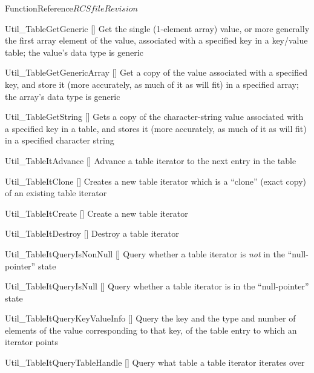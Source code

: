 \begin{cactuspart}{FunctionReference}{$RCSfile$}{$Revision$}
\begin{Lentry}
\item[Util\_TableGetGeneric]
     [\pageref{Util-TableGetGeneric}]
Get the single (1-element array) value, or more generally the
first array element of the value, associated with a specified key
in a key/value table; the value's data type is generic

\item[Util\_TableGetGenericArray]
     [\pageref{Util-TableGetGenericArray}]
Get a copy of the value associated with a specified key, and store
it (more accurately, as much of it as will fit) in a specified array;
the array's data type is generic

\item[Util\_TableGetString]
     [\pageref{Util-TableGetString}]
Gets a copy of the character-string value associated with a specified
key in a table, and stores it (more accurately, as much of it as will fit)
in a specified character string

\item[Util\_TableItAdvance]
     [\pageref{Util-TableItAdvance}]
Advance a table iterator to the next entry in the table

\item[Util\_TableItClone]
     [\pageref{Util-TableItClone}]
Creates a new table iterator which is a ``clone'' (exact copy) of an
existing table iterator

\item[Util\_TableItCreate]
     [\pageref{Util-TableItCreate}]
Create a new table iterator

\item[Util\_TableItDestroy]
     [\pageref{Util-TableItDestroy}]
Destroy a table iterator

\item[Util\_TableItQueryIsNonNull]
     [\pageref{Util-TableItQueryIsNonNull}]
Query whether a table iterator is {\em not\/} in the ``null-pointer'' state

\item[Util\_TableItQueryIsNull]
     [\pageref{Util-TableItQueryIsNull}]
Query whether a table iterator is in the ``null-pointer'' state

\item[Util\_TableItQueryKeyValueInfo]
     [\pageref{Util-TableItQueryKeyValueInfo}]
Query the key and the type and number of elements of the value
corresponding to that key, of the table entry to which an iterator points

\item[Util\_TableItQueryTableHandle]
     [\pageref{Util-TableItQueryTableHandle}]
Query what table a table iterator iterates over


\end{Lentry}
\end{cactuspart}
